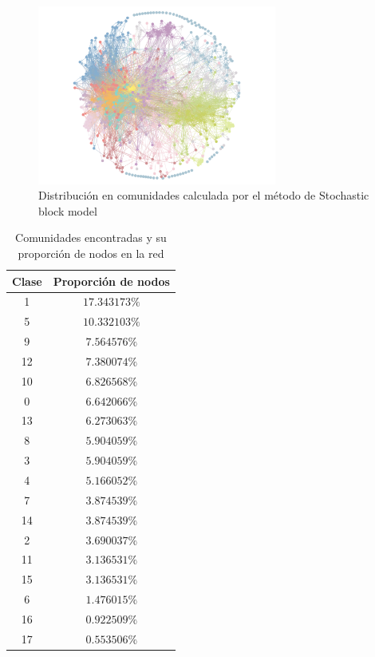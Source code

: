 \documentclass[10pt,a4paper,spanish]{article}
\numberwithin{equation}{section} %
\numberwithin{figure}{section} %
\numberwithin{table}{section} %
\begin{document}
\begin{figure}[!h]
    \centering
    \includegraphics[width=0.7\textwidth]{blockmodel}
    \caption{Distribución en comunidades calculada por el método de Stochastic block model}
    \label{blockmodel}
\end{figure}

\begin{table}[!h]
    \centering
    \begin{tabular}{c | c}
    Clase & Proporción de nodos \\
    \hline
    1  &   $17.343173\%$ \\
    5  &   $10.332103\%$ \\
    9  &    $7.564576\%$ \\
    12  &   $7.380074\%$ \\
    10  &   $6.826568\%$ \\
    0  &    $6.642066\%$ \\
    13  &   $6.273063\%$ \\
    8  &    $5.904059\%$ \\
    3  &    $5.904059\%$ \\
    4  &    $5.166052\%$ \\
    7  &    $3.874539\%$ \\
    14  &   $3.874539\%$ \\
    2  &    $3.690037\%$ \\
    11  &   $3.136531\%$ \\
    15  &   $3.136531\%$ \\
    6  &    $1.476015\%$ \\
    16  &   $0.922509\%$ \\
    17  &   $0.553506\%$ 
    \end{tabular}
    \caption{Comunidades encontradas y su proporción de nodos en la red}
    \label{comsb}
\end{table}
\end{document}
